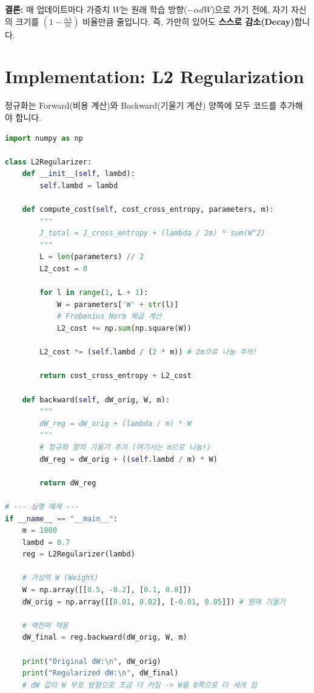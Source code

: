 \documentclass[11pt,a4paper]{book}
\theoremstyle{definition}
\begin{document}
\textbf{결론:} 매 업데이트마다 가중치 $W$는 원래 학습 방향($-\alpha dW$)으로 가기 전에, 자기 자신의 크기를 $(1 - \frac{\alpha \lambda}{m})$ 비율만큼 줄입니다. 즉, 가만히 있어도 \textbf{스스로 감소(Decay)}합니다.

\section{Implementation: L2 Regularization}

정규화는 Forward(비용 계산)와 Backward(기울기 계산) 양쪽에 모두 코드를 추가해야 합니다.

\begin{lstlisting}[language=Python, caption=L2 Regularization Implementation, breaklines=true]
import numpy as np

class L2Regularizer:
    def __init__(self, lambd):
        self.lambd = lambd

    def compute_cost(self, cost_cross_entropy, parameters, m):
        """
        J_total = J_cross_entropy + (lambda / 2m) * sum(W^2)
        """
        L = len(parameters) // 2
        L2_cost = 0
        
        for l in range(1, L + 1):
            W = parameters['W' + str(l)]
            # Frobenius Norm 제곱 계산
            L2_cost += np.sum(np.square(W))
            
        L2_cost *= (self.lambd / (2 * m)) # 2m으로 나눔 주의!
        
        return cost_cross_entropy + L2_cost

    def backward(self, dW_orig, W, m):
        """
        dW_reg = dW_orig + (lambda / m) * W
        """
        # 정규화 항의 기울기 추가 (여기서는 m으로 나눔!)
        dW_reg = dW_orig + ((self.lambd / m) * W)
        
        return dW_reg

# --- 실행 예제 ---
if __name__ == "__main__":
    m = 1000
    lambd = 0.7
    reg = L2Regularizer(lambd)
    
    # 가상의 W (Weight)
    W = np.array([[0.5, -0.2], [0.1, 0.8]])
    dW_orig = np.array([[0.01, 0.02], [-0.01, 0.05]]) # 원래 기울기
    
    # 역전파 적용
    dW_final = reg.backward(dW_orig, W, m)
    
    print("Original dW:\n", dW_orig)
    print("Regularized dW:\n", dW_final)
    # dW 값이 W 부호 방향으로 조금 더 커짐 -> W를 0쪽으로 더 세게 밈
\end{lstlisting}
\end{document}
